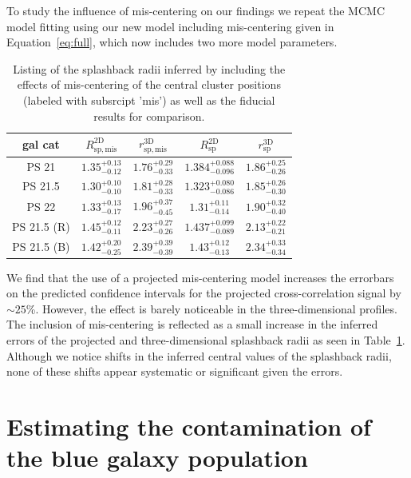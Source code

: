 \documentclass[iop, apjl, twocolappendix, numberedappendix]{emulateapj}
\begin{document}
To study the influence of mis-centering on our findings we repeat the
MCMC model fitting using our new model including mis-centering given
in Equation~\ref{eq:full}, which now includes two more model
parameters.

\begin{table}
    \centering
    \caption{Listing of the splashback radii inferred by including the effects of mis-centering of the central cluster positions (labeled with subsrcipt 'mis') as well as the fiducial results for comparison.}
    \label{tab:mis_splash}
    \begin{tabular}{ccc|cc}
    \hline
gal cat &  $R_{\mathrm{sp, mis}}^{\mathrm{2D}}$ & $r_{\mathrm{sp, mis}}^{\mathrm{3D}}$ &  $R_{\mathrm{sp}}^{\mathrm{2D}}$ & $r_{\mathrm{sp}}^{\mathrm{3D}}$\\
\hline
\hline
PS 21 &$1.35_{-0.12}^{+0.13}$ & $1.76_{-0.33}^{+0.29}$ & $1.384_{-0.096}^{+0.088}$ &$1.86_{-0.26}^{+0.25}$\\
\hline
PS 21.5 & $1.30_{-0.10}^{+0.10}$&$1.81_{-0.33}^{+0.28}$ & $1.323_{-0.086}^{+0.080}$&$1.85_{-0.30}^{+0.26}$\\
\hline
PS 22 &$1.33_{-0.17}^{+0.13}$ & $1.96_{-0.45}^{+0.37}$ & $1.31_{-0.14}^{+0.11}$ &$1.90_{-0.40}^{+0.32} $\\
\hline
PS 21.5 (R) & $1.45_{-0.11}^{+0.12}$ & $2.23_{-0.26}^{+0.27}$ & $1.437_{-0.089}^{+0.099}$ & $2.13_{-0.21}^{+0.22}$\\
\hline
PS 21.5 (B) & $1.42_{-0.25}^{+0.20}$ & $2.39_{-0.39}^{+0.39}$ & $1.43_{-0.13}^{+0.12}$ & $2.34_{-0.34}^{+0.33}$ \\
\hline
    \end{tabular}
\end{table}

We find that the use of a projected mis-centering model increases the
errorbars on the predicted confidence intervals for the projected
cross-correlation signal by $\sim 25$\%. However, the effect is barely
noticeable in the three-dimensional profiles.  The inclusion of
mis-centering is reflected as a small increase in the inferred errors
of the projected and three-dimensional splashback radii as seen in
Table~\ref{tab:mis_splash}. Although we notice shifts in the inferred
central values of the splashback radii, none of these shifts appear
systematic or significant given the errors.

\section{Estimating the contamination of the blue galaxy population}
\label{sec:Errors}
\end{document}
